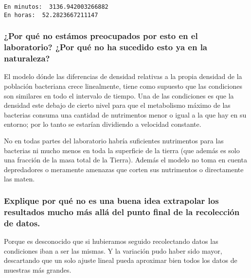 \documentclass[11pt]{article}
\begin{document}
    \begin{Verbatim}[commandchars=\\\{\}]
En minutos:  3136.942003266882
En horas:  52.2823667211147
    \end{Verbatim}

    \hypertarget{por-quuxe9-no-estuxe1mos-preocupados-por-esto-en-el-laboratorio-por-quuxe9-no-ha-sucedido-esto-ya-en-la-naturaleza}{%
\subsubsection*{¿Por qué no estámos preocupados por esto en el
laboratorio? ¿Por qué no ha sucedido esto ya en la
naturaleza?}\label{por-quuxe9-no-estuxe1mos-preocupados-por-esto-en-el-laboratorio-por-quuxe9-no-ha-sucedido-esto-ya-en-la-naturaleza}}

El modelo dónde las diferencias de densidad relativas a la propia
densidad de la población bacteriana crece linealmente, tiene como
supuesto que las condiciones son similares en todo el intervalo de
tiempo. Una de las condiciones es que la densidad este debajo de cierto
nivel para que el metabolismo máximo de las bacterias consuma una
cantidad de nutrimentos menor o igual a la que hay en su entorno; por lo
tanto se estarían dividiendo a velocidad constante.

No en todas partes del laboratorio habría suficientes nutrimentos para
las bacterias ni mucho menos en toda la superficie de la tierra (que
además es solo una fracción de la masa total de la Tierra). Además el
modelo no toma en cuenta depredadores o meramente amenazas que corten
sus nutrimentos o directamente las maten.

\hypertarget{explique-por-quuxe9-no-es-una-buena-idea-extrapolar-los-resultados-mucho-muxe1s-alluxe1-del-punto-final-de-la-recolecciuxf3n-de-datos.}{%
\subsubsection*{Explique por qué no es una buena idea extrapolar los
resultados mucho más allá del punto final de la recolección de
datos.}\label{explique-por-quuxe9-no-es-una-buena-idea-extrapolar-los-resultados-mucho-muxe1s-alluxe1-del-punto-final-de-la-recolecciuxf3n-de-datos.}}

Porque es desconocido que si hubieramos seguido recolectando datos las
condiciones iban a ser las mismas. Y la variación pudo haber sido mayor,
descartando que un solo ajuste lineal pueda aproximar bien todos los
datos de muestras más grandes.
\end{document}
